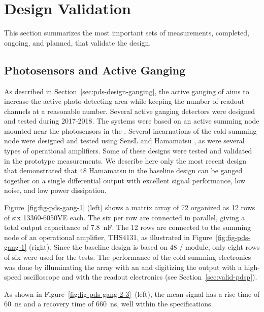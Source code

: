 \section{Design Validation}
\label{sec:fdsp-pd-validation}


This section summarizes the most important sets of measurements, completed, ongoing, and planned, that validate the   design. 


\subsection{Photosensors and Active Ganging}
\label{sec:pds-valid-ganging}

As described in Section~\ref{sec:pds-design-ganging}, the active ganging of  aims to increase the active photo-detecting area while keeping the number of readout channels at a reasonable number. 
Several active ganging detectors were designed and tested during 2017-2018. 
The systems were based on an active summing node mounted near the photosensors in the . Several incarnations of the cold summing node were designed and tested using SensL and Hamamatsu , 
as were several types of operational amplifiers.
Some of these designs were tested and validated in the  prototype measurements.
We describe here only the most recent design that demonstrated that 48 Hamamatsu  in the baseline design can be ganged together on a single differential output with excellent signal performance, low noise, and low power dissipation.

Figure~\ref{fig:fig-pds-gang-1} (left) shows a matrix array of 72  organized as 12 rows of six  13360-6050VE  each. 
The six  per row are connected in parallel, giving a total output capacitance of \SI{7.8}{nF}. The 12 rows are connected to the summing node of an operational amplifier, THS4131, as illustrated in Figure~\ref{fig:fig-pds-gang-1} (right). 
Since the  baseline design is based on 48 / module, only eight rows of six  were used for the tests. 
The performance of the cold summing electronics was done by illuminating the  array with an  and digitizing the output with a high-speed oscilloscope and with the  readout electronics (see 
Section~\ref{sec:valid-pdsp}).

As shown in Figure~\ref{fig:fig-pds-gang-2-3}~(left), the mean signal has a rise time of \SI{60}{ns} and a recovery time of \SI{660}{ns}, well within the   specifications.

